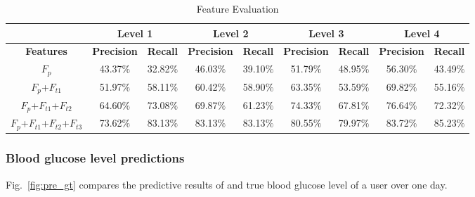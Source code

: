 \begin{table}[]
\small
\centering
\caption{Feature Evaluation}
\label{Feature_Evaluation}
\begin{tabular}{|c|c|c|c|c|c|c|c|c|}
\hline
                                   & \multicolumn{2}{c|}{\textbf{Level 1}}                     & \multicolumn{2}{c|}{\textbf{Level 2}} & \multicolumn{2}{c|}{\textbf{Level 3}}                     & \multicolumn{2}{c|}{\textbf{Level 4}}                     \\ \hline
\textbf{Features}                  & \textbf{Precision} & \multicolumn{1}{l|}{\textbf{Recall}} & \textbf{Precision}  & \textbf{Recall} & \textbf{Precision} & \multicolumn{1}{l|}{\textbf{Recall}} & \textbf{Precision} & \multicolumn{1}{l|}{\textbf{Recall}} \\ \hline
$F_{p}$                            & 43.37$\%$               & 32.82$\%$                                 & 46.03$\%$                & 39.10$\%$            & 51.79$\%$               & 48.95$\%$                                 & 56.30$\%$               & 43.49$\%$                                 \\ \hline
$F_{p}$+$F_{t1}$                   & 51.97$\%$               & 58.11$\%$                                 & 60.42$\%$                & 58.90$\%$            & 63.35$\%$               & 53.59$\%$                                 & 69.82$\%$               & 55.16$\%$                                 \\ \hline
$F_{p}$+$F_{t1}$+$F_{t2}$          & 64.60$\%$               & 73.08$\%$                                 & 69.87$\%$                & 61.23$\%$            & 74.33$\%$               & 67.81$\%$                                 & 76.64$\%$               & 72.32$\%$                                 \\ \hline
$F_{p}$+$F_{t1}$+$F_{t2}$+$F_{t3}$ & 73.62$\%$   & 83.13$\%$                                 & 83.13$\%$               & 83.13$\%$            & 80.55$\%$   & 79.97$\%$
& 83.72$\%$               & 85.23$\%$                                  \\ \hline
\end{tabular}
\end{table}


\subsubsection{Blood glucose level predictions}

Fig.~\ref{fig:pre_gt} compares the predictive results of \sysname and true blood glucose level of a user over one day.




